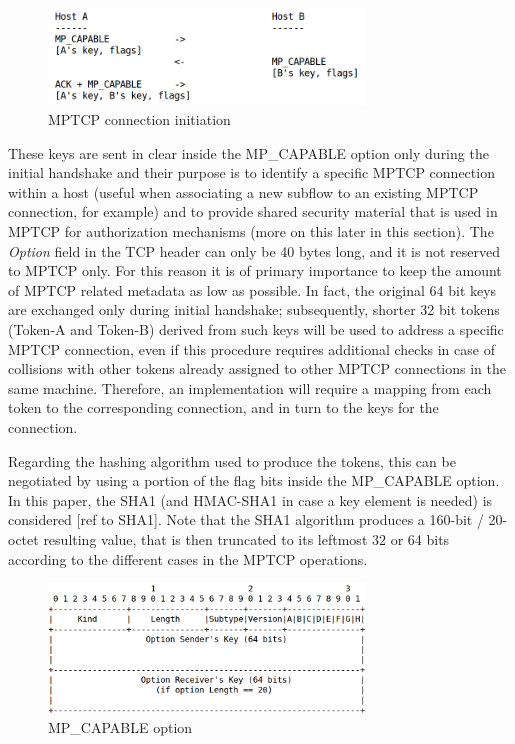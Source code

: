 \begin{figure}[!htb]
\centering
\includegraphics[width=0.75\textwidth]{images/mpcapable}
\caption{MPTCP connection initiation}
\label{fig:mpcapable}
\end{figure}

These keys are sent in clear inside the MP\_CAPABLE option only during the initial handshake and their purpose is to identify a specific MPTCP connection within a host (useful when associating a new subflow to an existing MPTCP connection, for example) and to provide shared security material that is used in MPTCP for authorization mechanisms (more on this later in this section). The \textit{Option} field in the TCP header can only be 40 bytes long, and it is not reserved to MPTCP only. For this reason it is of primary importance to keep the amount of MPTCP related metadata as low as possible. In fact, the original 64 bit keys are exchanged only during initial handshake; subsequently, shorter 32 bit tokens (Token-A and Token-B) derived from such keys will be used to address a specific MPTCP connection, even if this procedure requires additional checks in case of collisions with other tokens already assigned to other MPTCP connections in the same machine. Therefore, an implementation will require a mapping from each token to the corresponding connection, and in turn to the keys for the connection.


Regarding the hashing algorithm used to produce the tokens, this can be negotiated by using a portion of the flag bits inside the MP\_CAPABLE option. In this paper, the SHA1 (and HMAC-SHA1 in case a key element is needed) is considered [ref to SHA1]. Note that the SHA1 algorithm produces a 160-bit / 20-octet resulting value, that is then truncated to its leftmost 32 or 64 bits according to the different cases in the MPTCP operations.

\begin{figure}[!htb]
\centering
\includegraphics[width=0.75\textwidth]{images/opt_capable}
\caption{MP\_CAPABLE option}
\label{fig:opt_capable}
\end{figure}

